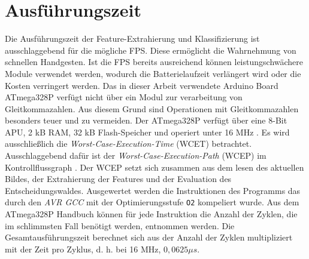 \section{Ausführungszeit}
\label{sec:eval_speed}
Die Ausführungszeit der Feature-Extrahierung und Klassifizierung ist ausschlaggebend für die mögliche FPS. Diese ermöglicht die Wahrnehmung von schnellen Handgesten. Ist die FPS bereits ausreichend
können leistungschwächere Module verwendet werden, wodurch die Batterielaufzeit verlängert wird oder die Kosten verringert werden.
\newline
\newline
Das in dieser Arbeit verwendete Arduino Board ATmega328P verfügt nicht über ein Modul zur verarbeitung von Gleitkommazahlen. Aus diesem Grund sind Operationen mit Gleitkommazahlen besonders teuer
und zu vermeiden. Der ATmega328P verfügt über eine 8-Bit APU, 2 kB RAM, 32 kB Flash-Speicher und operiert unter 16 MHz \cite{atmega328p}.
\newline
\newline
Es wird ausschließlich die \textit{Worst-Case-Execution-Time} (WCET) betrachtet. Ausschlaggebend dafür ist der \textit{Worst-Case-Execution-Path} (WCEP) im Kontrollflussgraph \cite{wcc_intro}. Der WCEP
setzt sich zusammen aus dem lesen des aktuellen Bildes, der Extrahierung der Features und der Evaluation des Entscheidungswaldes.
\newline
\newline
Ausgewertet werden die Instruktionen des Programms das durch den \textit{AVR GCC} mit der Optimierungsstufe \texttt{O2} kompeliert wurde. Aus dem ATmega328P Handbuch \cite{atmega328p} können
für jede Instruktion die Anzahl der Zyklen, die im schlimmsten Fall benötigt werden, entnommen werden. Die Gesamtausführungszeit berechnet sich aus der Anzahl der Zyklen multipliziert mit der Zeit
pro Zyklus, d. h. bei 16 MHz, $0,0625 \mu s$.



